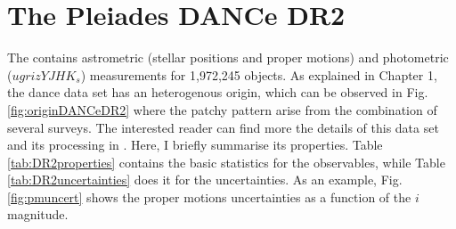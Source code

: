 %

\section{The Pleiades DANCe DR2}
\label{sect:DR2}

The  contains astrometric (stellar positions and proper motions) and photometric ($ugrizYJHK_s$) measurements for 1,972,245 objects. As explained in Chapter 1, the \gls{dance} data set has an heterogenous origin, which can be observed in Fig. \ref{fig:originDANCeDR2} where the patchy pattern arise from the combination of several surveys. The interested reader can find more the details of this data set and its processing in \citet{Bouy2013,Bouy2015}. Here, I briefly summarise its properties. Table \ref{tab:DR2properties} contains the basic statistics for the observables, while Table \ref{tab:DR2uncertainties} does it for the uncertainties. As an example, Fig. \ref{fig:pmuncert} shows the proper motions uncertainties as a function of the $i$ magnitude.

